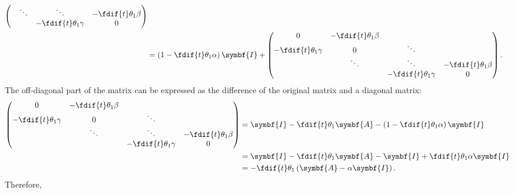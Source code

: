 \documentclass{article}
\begin{document}
\begin{align*}
\begin{pmatrix}
                                  & \ddots                   & \ddots                    & -\fdif{t} \theta_1 \beta \\
                                  &                          & -\fdif{t} \theta_1 \gamma & 0
    \end{pmatrix}
    \\
                                            & = \left( 1 - \fdif{t} \theta_1 \alpha \right) \symbf{I} +
    \begin{pmatrix}
        0                         & -\fdif{t} \theta_1 \beta &                           &                          \\
        -\fdif{t} \theta_1 \gamma & 0                        & \ddots                    &                          \\
                                  & \ddots                   & \ddots                    & -\fdif{t} \theta_1 \beta \\
                                  &                          & -\fdif{t} \theta_1 \gamma & 0
    \end{pmatrix}
    .
\end{align*}
The off-diagonal part of the matrix can be expressed as the difference
of the original matrix and a diagonal matrix:
\begin{align*}
    \begin{pmatrix}
        0                         & -\fdif{t} \theta_1 \beta &                           &                          \\
        -\fdif{t} \theta_1 \gamma & 0                        & \ddots                    &                          \\
                                  & \ddots                   & \ddots                    & -\fdif{t} \theta_1 \beta \\
                                  &                          & -\fdif{t} \theta_1 \gamma & 0
    \end{pmatrix}
     & = \symbf{I} - \fdif{t} \theta_1 \symbf{A} - \left( 1 - \fdif{t} \theta_1 \alpha \right) \symbf{I} \\
     & = \symbf{I} - \fdif{t} \theta_1 \symbf{A} - \symbf{I} + \fdif{t} \theta_1 \alpha \symbf{I}        \\
     & = -\fdif{t} \theta_1 \left( \symbf{A} - \alpha \symbf{I} \right).
\end{align*}
Therefore,
\end{document}
